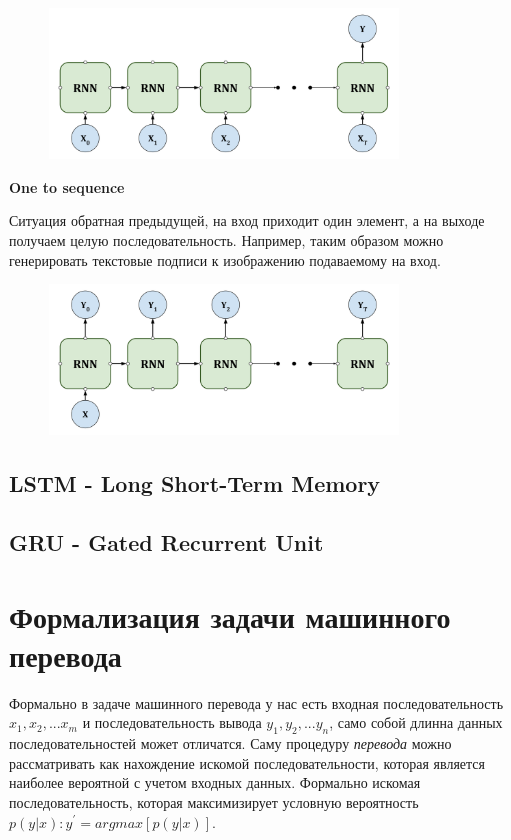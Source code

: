 \documentclass[a4paper,russian]{article}
\begin{document}
	\begin{figure}[ht!]
		\centering
		\captionsetup{justification=centering}
		\includegraphics[height=40mm]{img/rnn_seq_to_one.png}
	\end{figure}

	\textbf{One to sequence}
	
	Ситуация обратная предыдущей, на вход приходит один элемент, а на выходе получаем целую последовательность. Например, таким образом можно генерировать текстовые подписи к изображению подаваемому на вход.
	
	\begin{figure}[ht!]
		\centering
		\captionsetup{justification=centering}
		\includegraphics[height=40mm]{img/rnn_one_to_seq.png}
	\end{figure}
	
	\clearpage
	
	\subsection{LSTM - Long Short-Term Memory}
		
	\clearpage
	
	\subsection{GRU - Gated Recurrent Unit}
	
	\clearpage
	
	\section{Формализация задачи машинного перевода}
	Формально в задаче машинного перевода у нас есть входная последовательность $x_{1}, x_{2}, ... x_{m}$ и последовательность вывода $y_{1}, y_{2}, ... y_{n}$, само собой длинна данных последовательностей может отличатся. Саму процедуру \textit{перевода} можно рассматривать как нахождение искомой последовательности, которая является наиболее вероятной с учетом входных данных. Формально искомая последовательность, которая максимизирует условную вероятность $p(y|x): y^{'} = argmax[p(y|x)]$.
	
\end{document}
